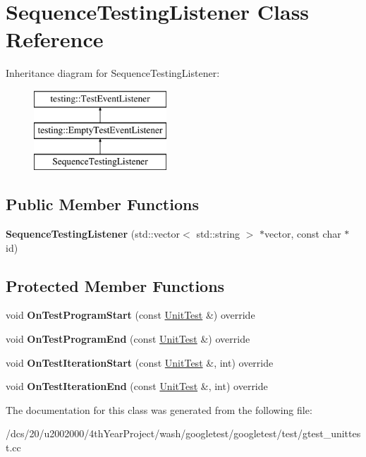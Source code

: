 \hypertarget{classSequenceTestingListener}{}\section{Sequence\+Testing\+Listener Class Reference}
\label{classSequenceTestingListener}
Inheritance diagram for Sequence\+Testing\+Listener\+:\begin{figure}[H]
\begin{center}
\leavevmode
\includegraphics[height=3.000000cm]{classSequenceTestingListener}
\end{center}
\end{figure}
\subsection*{Public Member Functions}
\begin{DoxyCompactItemize}
\item 
\mbox{\label{classSequenceTestingListener_ac0fcb350d20876f8273621ad4c79ba7a}} 
{\bfseries Sequence\+Testing\+Listener} (std\+::vector$<$ std\+::string $>$ $\ast$vector, const char $\ast$id)
\end{DoxyCompactItemize}
\subsection*{Protected Member Functions}
\begin{DoxyCompactItemize}
\item 
\mbox{\label{classSequenceTestingListener_a2dcf940322a480b210d8e5e934dd0a79}} 
void {\bfseries On\+Test\+Program\+Start} (const \mbox{\hyperlink{classtesting_1_1UnitTest}{Unit\+Test}} \&) override
\item 
\mbox{\label{classSequenceTestingListener_a506077b57a6789daf900e61285a58d8a}} 
void {\bfseries On\+Test\+Program\+End} (const \mbox{\hyperlink{classtesting_1_1UnitTest}{Unit\+Test}} \&) override
\item 
\mbox{\label{classSequenceTestingListener_a31ffb1bb77e88fff266511b1d8427e20}} 
void {\bfseries On\+Test\+Iteration\+Start} (const \mbox{\hyperlink{classtesting_1_1UnitTest}{Unit\+Test}} \&, int) override
\item 
\mbox{\label{classSequenceTestingListener_ae3a4e15e6c811a7b70992669d659e11e}} 
void {\bfseries On\+Test\+Iteration\+End} (const \mbox{\hyperlink{classtesting_1_1UnitTest}{Unit\+Test}} \&, int) override
\end{DoxyCompactItemize}


The documentation for this class was generated from the following file\+:\begin{DoxyCompactItemize}
\item 
/dcs/20/u2002000/4th\+Year\+Project/wash/googletest/googletest/test/gtest\+\_\+unittest.\+cc\end{DoxyCompactItemize}
